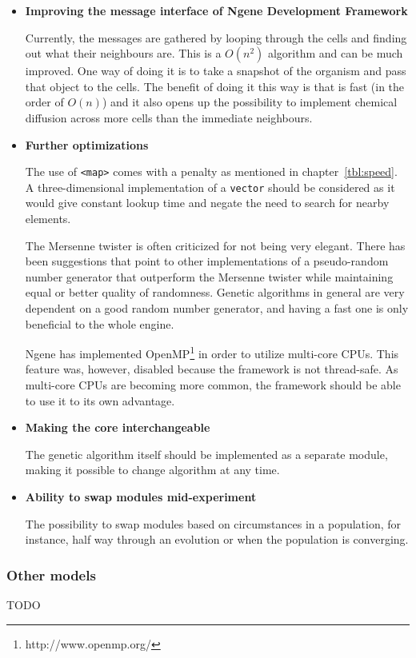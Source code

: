 \begin{itemize}
	\item\textbf{Improving the message interface of Ngene Development Framework}

	Currently, the messages are gathered by looping through the cells and finding out what their neighbours are. This is a $O(n^{2})$ algorithm and can be much improved. One way of doing it is to take a snapshot of the organism and pass that object to the cells. The benefit of doing it this way is that is fast (in the order of $O(n)$) and it also opens up the possibility to implement chemical diffusion across more cells than the immediate neighbours.

	\item\textbf{Further optimizations}

	The use of \texttt{<map>} comes with a penalty as mentioned in chapter~\ref{tbl:speed}. A three-dimensional implementation of a \texttt{vector} should be considered as it would give constant lookup time and negate the need to search for nearby elements.

	The Mersenne twister is often criticized for not being very elegant. There has been suggestions that point to other implementations of a pseudo-random number generator that outperform the Mersenne twister while maintaining equal or better quality of randomness. Genetic algorithms in general are very dependent on a good random number generator, and having a fast one is only beneficial to the whole engine.

	Ngene has implemented OpenMP\footnote{http://www.openmp.org/} in order to utilize multi-core CPUs. This feature was, however, disabled because the framework is not thread-safe. As multi-core CPUs are becoming more common, the framework should be able to use it to its own advantage.

	\item\textbf{Making the core interchangeable}

	The genetic algorithm itself should be implemented as a separate module, making it possible to change algorithm at any time.

	\item\textbf{Ability to swap modules mid-experiment}

	The possibility to swap modules based on circumstances in a population, for instance, half way through an evolution or when the population is converging.
\end{itemize}

\subsubsection{Other models}

TODO

